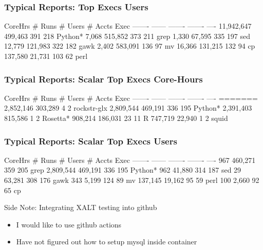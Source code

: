 \documentclass{beamer}
\begin{document}
\begin{frame}[fragile]
    \frametitle{Typical Reports: Top Execs Users}
 {\small
    \begin{semiverbatim}
   CoreHrs   # Runs  # Users  # Accts  Exec
   -------   ------  -------  -------  ----
11,942,647  499,463      391      218  Python*
     7,068  515,852      373      211  grep
     1,330   67,595      335      197  sed
    12,779  121,983      322      182  gawk
     2,402  583,091      136       97  mv
    16,366  131,215      132       94  cp
   137,580   21,731      103       62  perl
    \end{semiverbatim}
}
\end{frame}

\begin{frame}[fragile]
    \frametitle{Typical Reports: Scalar Top Execs Core-Hours}
 {\small
    \begin{semiverbatim}
  CoreHrs   # Runs  # Users  # Accts  Exec
  -------   ------  -------  -------  ----
=======
2,852,146  303,289        4        2  rockstr-glx
2,809,544  469,191      336      195  Python*
2,391,403  815,586        1        2  Rosetta*
  908,214  186,031       23       11  R
  747,719   22,940        1        2  squid
    \end{semiverbatim}
}
\end{frame}

\begin{frame}[fragile]
    \frametitle{Typical Reports: Scalar Top Execs Users}
 {\small
    \begin{semiverbatim}
  CoreHrs   # Runs  # Users  # Accts  Exec
  -------   ------  -------  -------  ----
      967  460,271      359      205  grep
2,809,544  469,191      336      195  Python*
      962   41,880      314      187  sed
       29   63,281      308      176  gawk
      343    5,199      124       89  mv
  137,145   19,162       95       59  perl
      100    2,660       92       65  cp
    \end{semiverbatim}
}
\end{frame}

\begin{frame}{Side Note: Integrating XALT testing into github}
  \begin{itemize}
    \item I would like to use github actions
    \item Have not figured out how to setup mysql inside container
  \end{itemize}
\end{frame}
\end{document}
